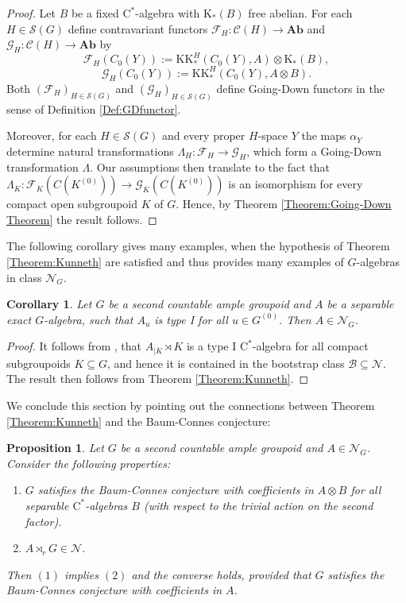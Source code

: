 \documentclass[reqno,oneside,a4paper,11pt]{amsart}
\theoremstyle{theorem}
\newtheorem{kor}[satz]{Corollary}
\newtheorem{prop}[satz]{Proposition}
\theoremstyle{definition}
\newcommand{\KK}{\mathrm{KK}}
\newcommand{\K}{\mathrm K}
\begin{document}
	\begin{proof}
		Let $B$ be a fixed $\mathrm{C}^*$-algebra with $\K_*(B)$ free abelian. For each $H\in \mathcal{S}(G)$ define contravariant functors
		$\mathcal{F}_H:\mathcal{C}(H)\rightarrow\mathbf{Ab}$ and $\mathcal{G}_H:\mathcal{C}(H)\rightarrow\mathbf{Ab}$ by
		$$\mathcal{F}_H(C_0(Y)):=\KK^H_*(C_0(Y),A)\otimes \K_*(B),$$
		$$\mathcal{G}_H(C_0(Y)):=\KK^H_*(C_0(Y),A\otimes B).$$
		Both $(\mathcal{F}_H)_{H\in\mathcal{S}(G)}$ and $(\mathcal{G}_H)_{H\in\mathcal{S}(G)}$ define Going-Down functors in the sense of Definition \ref{Def:GDfunctor}.
		
		Moreover, for each $H\in \mathcal{S}(G)$ and every proper $H$-space $Y$ the maps $\alpha_Y$ determine natural transformations $\Lambda_H:\mathcal{F}_H\rightarrow\mathcal{G}_H$, which form a Going-Down transformation $\Lambda$.
		Our assumptions then translate to the fact that $\Lambda_K:\mathcal{F}_K(C(K^{(0)}))\rightarrow \mathcal{G}_K(C(K^{(0)}))$ is an isomorphism for every compact open subgroupoid $K$ of $G$. Hence, by Theorem \ref{Theorem:Going-Down Theorem} the result follows.
	\end{proof}
	The following corollary gives many examples, when the hypothesis of Theorem \ref{Theorem:Kunneth} are satisfied and thus provides many examples of $G$-algebras in class $\mathcal{N}_G$.
	\begin{kor}\label{Cor:Kunneth}
		Let $G$ be a second countable ample groupoid and $A$ be a separable exact $G$-algebra, such that $A_u$ is type I for all $u\in G^{(0)}$. Then $A\in\mathcal{N}_G$.
	\end{kor}
	\begin{proof}
		It follows from \cite[Proposition~10.3]{Tu98}, that $A_{\mid K}\rtimes K$ is a type I $\mathrm{C}^*$-algebra for all compact subgroupoids $K\subseteq G$, and hence it is contained in the bootstrap class $\mathcal{B}\subseteq \mathcal{N}$. The result then follows from Theorem \ref{Theorem:Kunneth}.
	\end{proof}
	We conclude this section by pointing out the connections between Theorem \ref{Theorem:Kunneth} and the Baum-Connes conjecture:
	\begin{prop}\label{Prop:BCandKunneth}
		Let $G$ be a second countable ample groupoid and $A\in\mathcal{N}_G$. Consider the following properties:
		\begin{enumerate}
			\item $G$ satisfies the Baum-Connes conjecture with coefficients in $A\otimes B$ for all separable $\mathrm{C}^*$-algebras $B$ (with respect to the trivial action on the second factor).
			\item $A\rtimes_r G\in\mathcal{N}$.
		\end{enumerate}
		Then $(1)$ implies $(2)$ and the converse holds, provided that $G$ satisfies the Baum-Connes conjecture with coefficients in $A$.
	\end{prop}
\end{document}
